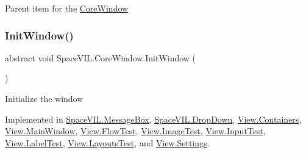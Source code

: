 Parent item for the \mbox{\hyperlink{class_space_v_i_l_1_1_core_window}{Core\+Window}} 

\mbox{\label{class_space_v_i_l_1_1_core_window_aa3cf4ac54d9651b1149584dc81042824}} 
\subsubsection{\texorpdfstring{Init\+Window()}{InitWindow()}}
{\footnotesize\ttfamily abstract void Space\+V\+I\+L.\+Core\+Window.\+Init\+Window (\begin{DoxyParamCaption}{ }\end{DoxyParamCaption})\hspace{0.3cm}{\ttfamily [pure virtual]}}



Initialize the window 



Implemented in \mbox{\hyperlink{class_space_v_i_l_1_1_message_box_ac14ecd2643e043c578ef4cf568887daf}{Space\+V\+I\+L.\+Message\+Box}}, \mbox{\hyperlink{class_space_v_i_l_1_1_drop_down_a291f706e5ec6558798d20fa428b2ba91}{Space\+V\+I\+L.\+Drop\+Down}}, \mbox{\hyperlink{class_view_1_1_containers_a78f0f1f1a35caf1cc7a1f4a9a9d159a2}{View.\+Containers}}, \mbox{\hyperlink{class_view_1_1_main_window_a1c3022ebb735b59e12ba1e9bc5cf3a90}{View.\+Main\+Window}}, \mbox{\hyperlink{class_view_1_1_flow_test_abf842c8c39e43a9d0e4b160b04084f90}{View.\+Flow\+Test}}, \mbox{\hyperlink{class_view_1_1_image_test_aa7b380fa57f08a6628ca45aec3d2254e}{View.\+Image\+Test}}, \mbox{\hyperlink{class_view_1_1_input_test_a9887db9b33135e82710ac4c02ffcec52}{View.\+Input\+Test}}, \mbox{\hyperlink{class_view_1_1_label_test_afc1aadc0634c9a71494e371204bfdf08}{View.\+Label\+Test}}, \mbox{\hyperlink{class_view_1_1_layouts_test_a6e89f1beff3ea667915a0987203df404}{View.\+Layouts\+Test}}, and \mbox{\hyperlink{class_view_1_1_settings_a14740ebfdf1f004feb4b7248bf3e567a}{View.\+Settings}}.

\mbox{\label{class_space_v_i_l_1_1_core_window_a24e6d614aac5f7e1c8274edf92c214c5}} 
